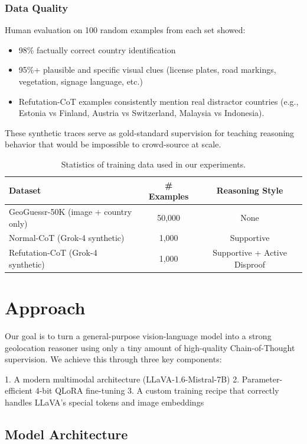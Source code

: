 \documentclass[11pt,a4paper]{article}
\begin{document}
\subsubsection{Data Quality}
Human evaluation on 100 random examples from each set showed:
\begin{itemize}
    \item 98\% factually correct country identification
    \item 95\%+ plausible and specific visual clues (license plates, road markings, vegetation, signage language, etc.)
    \item Refutation-CoT examples consistently mention real distractor countries (e.g., Estonia vs Finland, Austria vs Switzerland, Malaysia vs Indonesia).
\end{itemize}

These synthetic traces serve as gold-standard supervision for teaching reasoning behavior that would be impossible to crowd-source at scale.

\begin{table}[t]
\centering
\caption{Statistics of training data used in our experiments.}
\label{tab:data_stats}
\begin{tabular}{lcc}
\toprule
Dataset & \# Examples & Reasoning Style \\
\midrule
GeoGuessr-50K (image + country only) & 50,000 & None \\
Normal-CoT (Grok-4 synthetic) & 1,000 & Supportive \\
Refutation-CoT (Grok-4 synthetic) & 1,000 & Supportive + Active Disproof \\
\bottomrule
\end{tabular}
\end{table}


\section{Approach}
\label{sec:method}

Our goal is to turn a general-purpose vision-language model into a strong geolocation reasoner using only a tiny amount of high-quality Chain-of-Thought supervision. We achieve this through three key components:

1. A modern multimodal architecture (LLaVA-1.6-Mistral-7B)  
2. Parameter-efficient 4-bit QLoRA fine-tuning  
3. A custom training recipe that correctly handles LLaVA’s special tokens and image embeddings

\subsection{Model Architecture}
\end{document}
